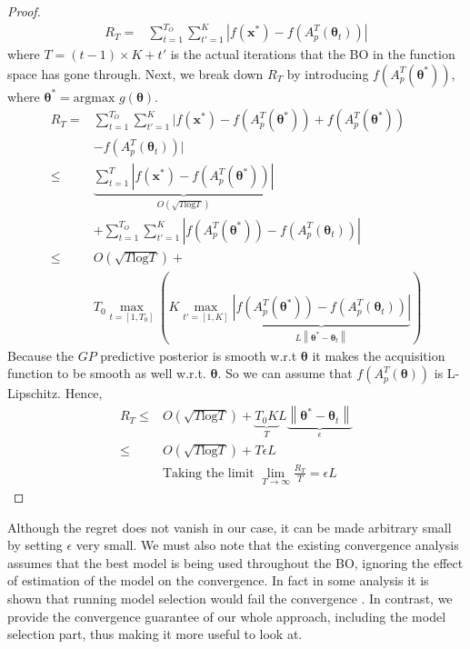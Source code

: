 \begin{proof}
\begin{align*}
R_{T} = & \sum_{t=1}^{T_{O}}\sum_{t'=1}^{K}|f(\boldsymbol{x}^{*})-f(A_{p}^{T}(\boldsymbol{\theta}_{t}))|
\end{align*}
where $T=(t-1)\times K+t'$ is the actual iterations that the BO in the function space has gone through. Next, we break down $R_{T}$ by introducing $f(A_{p}^{T}(\boldsymbol{\theta}^{*}))$, where $\boldsymbol{\theta}^{*}=\text{argmax }g(\boldsymbol{\theta})$.
\begin{align*}
R_T= & \sum_{t=1}^{T_{O}}\sum_{t'=1}^{K} |f(\boldsymbol{x}^{*})-f(A_{p}^{T}(\boldsymbol{\theta}^{*})) +f(A_{p}^{T}(\boldsymbol{\theta}^{*}))\\
&-f(A_{p}^{T}(\boldsymbol{\theta}_t))|\\ 
\leq & \underbrace{\sum_{t=1}^{T}|f(\boldsymbol{x}^{*})-f(A_{p}^{T}(\boldsymbol{\theta}^{*}))|}_{O(\sqrt{T\text{log}T})}\\
&+\sum_{t=1}^{T_{O}}\sum_{t'=1}^{K} |f(A_{p}^{T}(\boldsymbol{\theta}^{*}))-f(A_{p}^{T}(\boldsymbol{\theta}_t))|\\ 
\leq & O(\sqrt{T\text{log}T})+\\
&T_{0} \operatorname*{max}_{t= [1,T_{0}]}(K \operatorname*{max}_{t'= [1,K]}\underbrace{|f(A_{p}^{T}(\boldsymbol{\theta}^{*}))-f(A_{p}^{T}(\boldsymbol{\theta}_t))|}_{L\left\|\boldsymbol{\theta}^{*}-\boldsymbol{\theta}_{t}\right\|})
\end{align*}
Because the $GP$ predictive posterior is smooth w.r.t $\boldsymbol{\theta}$ it makes the acquisition function to be smooth as well w.r.t. $\boldsymbol{\theta}$. So we can assume that $f(A_{p}^{T}(\boldsymbol{\theta}))$ is L-Lipschitz. Hence,
\begin{align*}
R_T\leq & O(\sqrt{T\text{log}T})+\underbrace{T_{0} K}_{T} L\underbrace{\left\|\boldsymbol{\theta}^{*}-\boldsymbol{\theta}_{t}\right\|}_{\epsilon} \\ 
\leq & O(\sqrt{T\text{log}T})+T \epsilon L \\ 
& \text{Taking the limit }\lim_{T \rightarrow \infty} \frac{R_{T}}{T} = \epsilon L
\end{align*}
\end{proof}
Although the regret does not vanish in our case, it can be made arbitrary small by setting $\epsilon$ very small. We must also note that the existing convergence analysis assumes that the best model is being used throughout the BO, ignoring the effect of estimation of the model on the convergence. In fact in some analysis it is shown that running model selection would fail the convergence \cite{bull2011convergence}. In contrast, we provide the convergence guarantee of our whole approach, including the model selection part, thus making it more useful to look at.